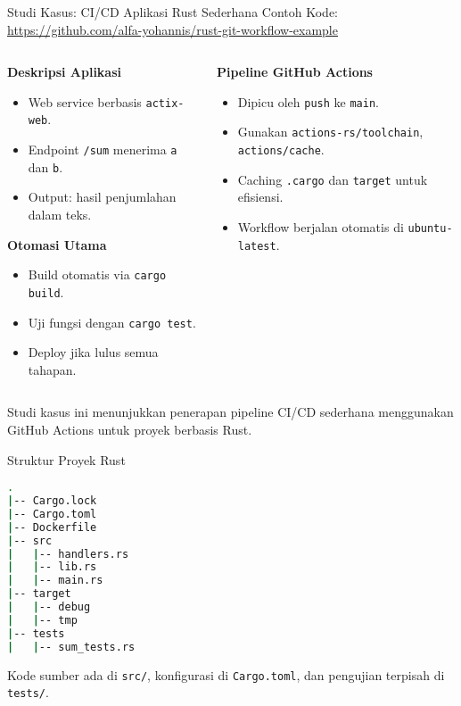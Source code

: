 \documentclass[aspectratio=169, table]{beamer}
\begin{document}
\begin{frame}[fragile]{Studi Kasus: CI/CD Aplikasi Rust Sederhana}
	\vspace{20pt}
	Contoh Kode: \url{https://github.com/alfa-yohannis/rust-git-workflow-example}
	\begin{columns}[T]
		\begin{column}{0.5\textwidth}
			\textbf{Deskripsi Aplikasi}
			\begin{itemize}
				\item Web service berbasis \texttt{actix-web}.
				\item Endpoint \texttt{/sum} menerima \texttt{a} dan \texttt{b}.
				\item Output: hasil penjumlahan dalam teks.
			\end{itemize}
			
			\vspace{4pt}
			\textbf{Otomasi Utama}
			\begin{itemize}
				\item Build otomatis via \texttt{cargo build}.
				\item Uji fungsi dengan \texttt{cargo test}.
				\item Deploy jika lulus semua tahapan.
			\end{itemize}
		\end{column}
		
		\begin{column}{0.5\textwidth}
			\textbf{Pipeline GitHub Actions}
			\begin{itemize}
				\item Dipicu oleh \texttt{push} ke \texttt{main}.
				\item Gunakan \texttt{actions-rs/toolchain}, \texttt{actions/cache}.
				\item Caching \texttt{.cargo} dan \texttt{target} untuk efisiensi.
				\item Workflow berjalan otomatis di \texttt{ubuntu-latest}.
			\end{itemize}
			
			
		\end{column}
	\end{columns}
\vspace{6pt}
Studi kasus ini menunjukkan penerapan pipeline CI/CD sederhana menggunakan GitHub Actions untuk proyek berbasis Rust.
\end{frame}

\begin{frame}[fragile]{Struktur Proyek Rust}
\vspace{20pt}
\begin{lstlisting}[language=bash]
.
|-- Cargo.lock
|-- Cargo.toml
|-- Dockerfile
|-- src
|   |-- handlers.rs
|   |-- lib.rs
|   |-- main.rs
|-- target
|   |-- debug
|   |-- tmp
|-- tests
|   |-- sum_tests.rs
\end{lstlisting}

Kode sumber ada di \texttt{src/}, konfigurasi di \texttt{Cargo.toml}, dan pengujian terpisah di \texttt{tests/}.
\end{frame}
\end{document}
